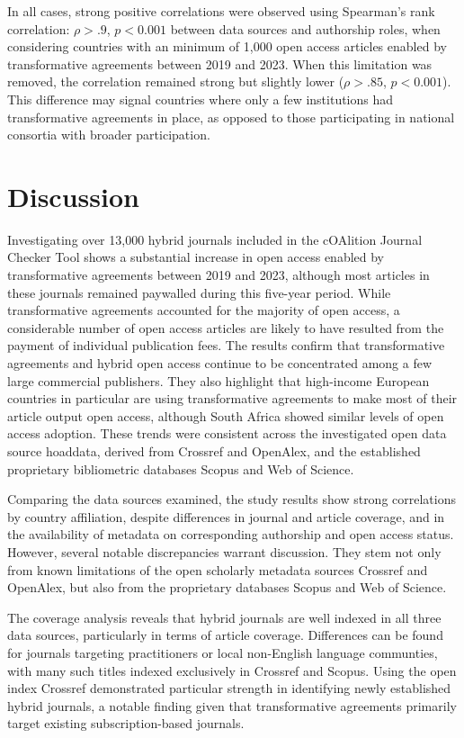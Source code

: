 \documentclass[a4paper,man,floatsintext,longtable,noextraspace,10pt]{apa6}
\begin{document}
In all cases, strong positive correlations were observed using
Spearman's rank correlation: \(\rho > .9\), \(p < 0.001\) between data
sources and authorship roles, when considering countries with an minimum
of 1,000 open access articles enabled by transformative agreements
between 2019 and 2023. When this limitation was removed, the correlation
remained strong but slightly lower (\(\rho > .85\), \(p < 0.001\)). This
difference may signal countries where only a few institutions had
transformative agreements in place, as opposed to those participating in
national consortia with broader participation.

\section{Discussion}\label{discussion}

Investigating over 13,000 hybrid journals included in the cOAlition
Journal Checker Tool shows a substantial increase in open access enabled
by transformative agreements between 2019 and 2023, although most
articles in these journals remained paywalled during this five-year
period. While transformative agreements accounted for the majority of
open access, a considerable number of open access articles are likely to
have resulted from the payment of individual publication fees. The
results confirm that transformative agreements and hybrid open access
continue to be concentrated among a few large commercial publishers.
They also highlight that high-income European countries in particular
are using transformative agreements to make most of their article output
open access, although South Africa showed similar levels of open access
adoption. These trends were consistent across the investigated open data
source hoaddata, derived from Crossref and OpenAlex, and the established
proprietary bibliometric databases Scopus and Web of Science.

Comparing the data sources examined, the study results show strong
correlations by country affiliation, despite differences in journal and
article coverage, and in the availability of metadata on corresponding
authorship and open access status. However, several notable
discrepancies warrant discussion. They stem not only from known
limitations of the open scholarly metadata sources Crossref and
OpenAlex, but also from the proprietary databases Scopus and Web of
Science.

The coverage analysis reveals that hybrid journals are well indexed in
all three data sources, particularly in terms of article coverage.
Differences can be found for journals targeting practitioners or local
non-English language communties, with many such titles indexed
exclusively in Crossref and Scopus. Using the open index Crossref
demonstrated particular strength in identifying newly established hybrid
journals, a notable finding given that transformative agreements
primarily target existing subscription-based journals.
\end{document}
